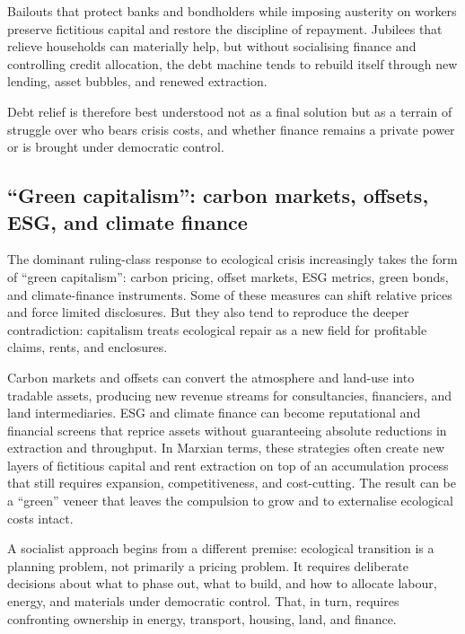 Bailouts that protect banks and bondholders while imposing austerity on workers preserve fictitious capital and restore the
discipline of repayment. Jubilees that relieve households can materially help, but without socialising finance and controlling
credit allocation, the debt machine tends to rebuild itself through new lending, asset bubbles, and renewed extraction.

Debt relief is therefore best understood not as a final solution but as a terrain of struggle over who bears crisis costs,
and whether finance remains a private power or is brought under democratic control.

\subsection{``Green capitalism'': carbon markets, offsets, ESG, and climate finance}
\label{sec:policy-green-capitalism}

The dominant ruling-class response to ecological crisis increasingly takes the form of ``green capitalism'': carbon pricing,
offset markets, ESG metrics, green bonds, and climate-finance instruments. Some of these measures can shift relative prices
and force limited disclosures. But they also tend to reproduce the deeper contradiction: capitalism treats ecological repair
as a new field for profitable claims, rents, and enclosures.

Carbon markets and offsets can convert the atmosphere and land-use into tradable assets, producing new revenue streams for
consultancies, financiers, and land intermediaries. ESG and climate finance can become reputational and financial screens
that reprice assets without guaranteeing absolute reductions in extraction and throughput. In Marxian terms, these strategies
often create new layers of fictitious capital and rent extraction on top of an accumulation process that still requires
expansion, competitiveness, and cost-cutting. The result can be a ``green'' veneer that leaves the compulsion to grow and to
externalise ecological costs intact.

A socialist approach begins from a different premise: ecological transition is a planning problem, not primarily a pricing
problem. It requires deliberate decisions about what to phase out, what to build, and how to allocate labour, energy, and
materials under democratic control. That, in turn, requires confronting ownership in energy, transport, housing, land, and
finance.

